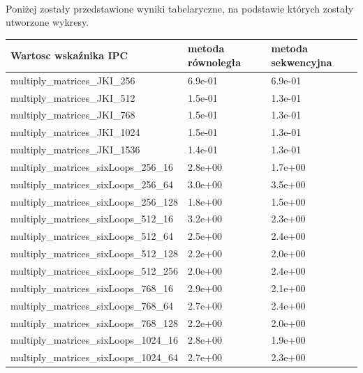\documentclass{scrartcl}
\begin{document}
\paragraph{} Poniżej zostały przedstawione wyniki tabelaryczne, na podstawie których zostały utworzone wykresy.
\begin{table}[H]
\begin{tabular}{|l|l|l|}
\hline
Wartosc wskaźnika IPC         & metoda równoległa & metoda sekwencyjna \\ \hline
multiply\_matrices\_JKI\_256  & 6.9e-01           & 6.9e-01            \\ \hline
multiply\_matrices\_JKI\_512  & 1.5e-01           & 1.3e-01            \\ \hline
multiply\_matrices\_JKI\_768  & 1.5e-01           & 1.3e-01            \\ \hline
multiply\_matrices\_JKI\_1024 & 1.5e-01           & 1.3e-01            \\ \hline
multiply\_matrices\_JKI\_1536 & 1.4e-01           & 1.3e-01            \\ \hline
multiply\_matrices\_sixLoops\_256\_16   & 2.8e+00           & 1.7e+00            \\ \hline
multiply\_matrices\_sixLoops\_256\_64   & 3.0e+00           & 3.5e+00            \\ \hline
multiply\_matrices\_sixLoops\_256\_128  & 1.8e+00           & 1.5e+00            \\ \hline
multiply\_matrices\_sixLoops\_512\_16   & 3.2e+00           & 2.3e+00            \\ \hline
multiply\_matrices\_sixLoops\_512\_64   & 2.5e+00           & 2.4e+00            \\ \hline
multiply\_matrices\_sixLoops\_512\_128  & 2.2e+00           & 2.0e+00            \\ \hline
multiply\_matrices\_sixLoops\_512\_256  & 2.0e+00           & 2.4e+00            \\ \hline
multiply\_matrices\_sixLoops\_768\_16   & 2.9e+00           & 2.1e+00            \\ \hline
multiply\_matrices\_sixLoops\_768\_64   & 2.7e+00           & 2.4e+00            \\ \hline
multiply\_matrices\_sixLoops\_768\_128  & 2.2e+00           & 2.0e+00            \\ \hline
multiply\_matrices\_sixLoops\_1024\_16  & 2.8e+00           & 1.9e+00            \\ \hline
multiply\_matrices\_sixLoops\_1024\_64  & 2.7e+00           & 2.3e+00            \\ \hline

\end{tabular}
\end{table}
\end{document}
